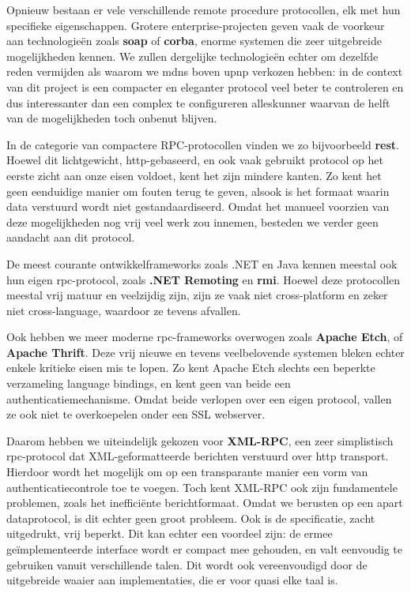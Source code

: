 Opnieuw bestaan er vele verschillende remote procedure protocollen, elk met hun specifieke eigenschappen. Grotere enterprise-projecten geven vaak de voorkeur aan technologieën zoals \textbf{\ac{soap}} of \textbf{\ac{corba}}, enorme systemen die zeer uitgebreide mogelijkheden kennen. We zullen dergelijke technologieën echter om dezelfde reden vermijden als waarom we \ac{mdns} boven \ac{upnp} verkozen hebben: in de context van dit project is een compacter en eleganter protocol veel beter te controleren en dus interessanter dan een complex te configureren alleskunner waarvan de helft van de mogelijkheden toch onbenut blijven.

In de categorie van compactere RPC-protocollen vinden we zo bijvoorbeeld \textbf{\ac{rest}}. Hoewel dit lichtgewicht, \ac{http}-gebaseerd, en ook vaak gebruikt protocol op het eerste zicht aan onze eisen voldoet, kent het zijn mindere kanten. Zo kent het geen eenduidige manier om fouten terug te geven, alsook is het formaat waarin data verstuurd wordt niet gestandaardiseerd. Omdat het manueel voorzien van deze mogelijkheden nog vrij veel werk zou innemen, besteden we verder geen aandacht aan dit protocol.

De meest courante ontwikkelframeworks zoals .NET en Java kennen meestal ook hun eigen \ac{rpc}-protocol, zoals \textbf{.NET Remoting} en \textbf{\ac{rmi}}. Hoewel deze protocollen meestal vrij matuur en veelzijdig zijn, zijn ze vaak niet cross-platform en zeker niet cross-language, waardoor ze tevens afvallen.

Ook hebben we meer moderne \ac{rpc}-frameworks overwogen zoals \textbf{Apache Etch}, of \textbf{Apache Thrift}. Deze vrij nieuwe en tevens veelbelovende systemen bleken echter enkele kritieke eisen mis te lopen. Zo kent Apache Etch slechts een beperkte verzameling language bindings, en kent geen van beide een authenticatiemechanisme. Omdat beide verlopen over een eigen protocol, vallen ze ook niet te overkoepelen onder een SSL webserver.

Daarom hebben we uiteindelijk gekozen voor \textbf{XML-RPC}, een zeer simplistisch \ac{rpc}-protocol dat XML-geformatteerde berichten verstuurd over \ac{http} transport. Hierdoor wordt het mogelijk om op een transparante manier een vorm van authenticatiecontrole toe te voegen. Toch kent XML-RPC ook zijn fundamentele problemen, zoals het inefficiënte berichtformaat. Omdat we berusten op een apart dataprotocol, is dit echter geen groot probleem. Ook is de specificatie, zacht uitgedrukt, vrij beperkt. Dit kan echter een voordeel zijn: de ermee geïmplementeerde interface wordt er compact mee gehouden, en valt eenvoudig te gebruiken vanuit verschillende talen. Dit wordt ook vereenvoudigd door de uitgebreide waaier aan implementaties, die er voor quasi elke taal is.

